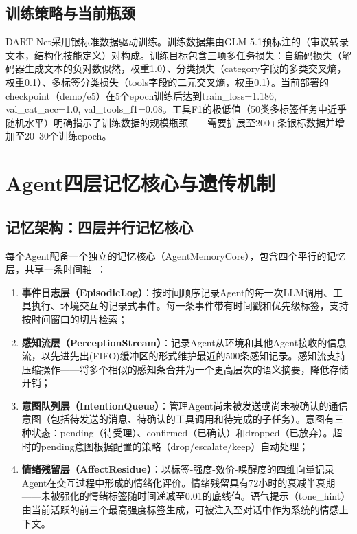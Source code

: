 \documentclass[twocolumn,10.5pt]{ctexart}
\begin{document}
\subsection{训练策略与当前瓶颈}

DART-Net采用银标准数据驱动训练。训练数据集由GLM-5.1预标注的（审议转录文本，结构化技能定义）对构成。训练目标包含三项多任务损失：自编码损失（解码器生成文本的负对数似然，权重1.0）、分类损失（category字段的多类交叉熵，权重0.1）、多标签分类损失（tools字段的二元交叉熵，权重0.1）。当前部署的checkpoint（demo/e5）在5个epoch训练后达到train\_loss=1.186, val\_cat\_acc=1.0, val\_tools\_f1=0.08。工具F1的极低值（50类多标签任务中近乎随机水平）明确指示了训练数据的规模瓶颈——需要扩展至200+条银标数据并增加至20--30个训练epoch。

\section{Agent四层记忆核心与遗传机制}

\subsection{记忆架构：四层并行记忆核心}

每个Agent配备一个独立的记忆核心（AgentMemoryCore），包含四个平行的记忆层，共享一条时间轴~\cite{sumers2023coala}：

\begin{enumerate}[itemsep=0pt,topsep=0pt]
  \item \textbf{事件日志层（EpisodicLog）}：按时间顺序记录Agent的每一次LLM调用、工具执行、环境交互的记录式事件。每一条事件带有时间戳和优先级标签，支持按时间窗口的切片检索；
  \item \textbf{感知流层（PerceptionStream）}：记录Agent从环境和其他Agent接收的信息流，以先进先出(FIFO)缓冲区的形式维护最近的500条感知记录。感知流支持压缩操作——将多个相似的感知条合并为一个更高层次的语义摘要，降低存储开销；
  \item \textbf{意图队列层（IntentionQueue）}：管理Agent尚未被发送或尚未被确认的通信意图（包括待发送的消息、待确认的工具调用和待完成的子任务）。意图有三种状态：pending（待受理）、confirmed（已确认）和dropped（已放弃）。超时的pending意图根据配置的策略（drop/escalate/keep）自动处理；
  \item \textbf{情绪残留层（AffectResidue）}：以标签-强度-效价-唤醒度的四维向量记录Agent在交互过程中形成的情绪化评价。情绪残留具有72小时的衰减半衰期——未被强化的情绪标签随时间递减至0.01的底线值。语气提示（tone\_hint）由当前活跃的前三个最高强度标签生成，可被注入至对话中作为系统的情感上下文。
\end{enumerate}
\end{document}
